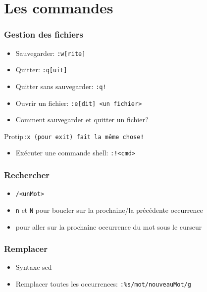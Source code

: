 \documentclass{beamer}
\begin{document}
\section{Les commandes}
\begin{frame} \frametitle{Gestion des fichiers}
  \begin{itemize}
    \item Sauvegarder: {\tt :w[rite]}
    \item Quitter: {\tt :q[uit]}
    \item Quitter sans sauvegarder: {\tt :q!}
    \item Ouvrir un fichier: {\tt :e[dit] <un fichier>}
  \end{itemize}
\end{frame}
\begin{frame}
  \begin{itemize}
    \item Comment sauvegarder et quitter un fichier? 
  \end{itemize}
  \pause
  \begin{exampleblock}{Protip}{\tt :x (pour exit) fait la même chose!}\end{exampleblock}
\end{frame}
\begin{frame}
  \begin{itemize}
    \item Exécuter une commande shell: {\tt :!<cmd>}
  \end{itemize}
\end{frame}
\begin{frame} \frametitle{Rechercher}
  \begin{itemize}
    \item {\tt /<unMot>}
    \item {\tt n} et {\tt N} pour boucler sur la prochaine/la précédente
      occurrence
  \end{itemize}
  \begin{itemize}
    \item {\tt *} pour aller sur la prochaine occurrence du mot sous le curseur
  \end{itemize}
\end{frame}
\begin{frame} \frametitle{Remplacer}
  \begin{itemize}
    \item Syntaxe sed
    \item Remplacer toutes les occurrences: {\tt :\%s/mot/nouveauMot/g}
  \end{itemize}
\end{frame}
\end{document}
